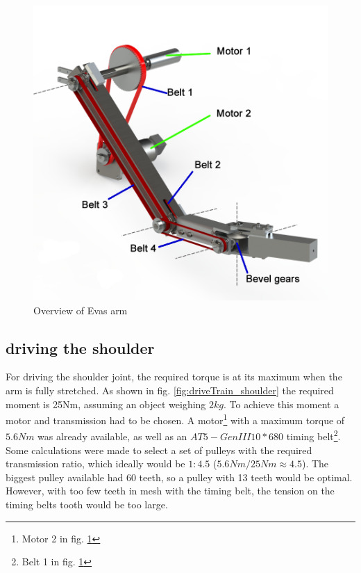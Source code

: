 \documentclass[technical_document.tex]{subfiles}
\begin{document}
\begin{figure}[ht!]
	\centering
	\mbox{\includegraphics[scale=1.0]{Images/overview_legenda.png}}
	\caption{Overview of Eva\textquotesingle{}s arm}
	\label{fig:overviewLegenda}
\end{figure}


\subsection{driving the shoulder}
 
 For driving the shoulder joint, the required torque is at its maximum when the arm is fully stretched. As shown in fig. \ref{fig:driveTrain_shoulder} the required moment is 25Nm, assuming an object weighing $2kg$. To achieve this moment a motor and transmission had to be chosen. A motor\footnote{Motor 2 in fig. \ref{fig:overviewLegenda}} with a maximum torque of $5.6Nm$ was already available, as well as an $AT5-GenIII 10*680$ timing belt\footnote{Belt 1 in fig. \ref{fig:overviewLegenda}}. Some calculations were made to select a set of pulleys with the required transmission ratio, which ideally would be $1:4.5$ ($5.6Nm / 25Nm \approx 4.5$). The biggest pulley available had 60 teeth, so a pulley with 13 teeth would be optimal. However, with too few teeth in mesh with the timing belt, the tension on the timing belt\textquotesingle{}s tooth would be too large.
 
\end{document}
